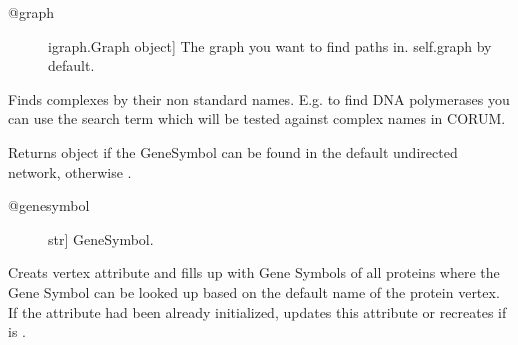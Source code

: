 \documentclass[letterpaper,10pt,english]{sphinxmanual}
\begin{document}
\begin{fulllineitems}
\begin{fulllineitems}
\begin{description}
\item[{@graph}] \leavevmode{[}igraph.Graph object{]}
The graph you want to find paths in. self.graph by default.

\end{description}

\end{fulllineitems}


\begin{fulllineitems}
\label{\detokenize{main:pypath.main.PyPath.find_complex}}
Finds complexes by their non standard names.
E.g. to find DNA polymerases you can use the search
term  which will be tested against complex names
in CORUM.

\end{fulllineitems}


\begin{fulllineitems}
\label{\detokenize{main:pypath.main.PyPath.genesymbol}}
Returns  object if the GeneSymbol
can be found in the default undirected network,
otherwise .
\begin{description}
\item[{@genesymbol}] \leavevmode{[}str{]}
GeneSymbol.

\end{description}

\end{fulllineitems}


\begin{fulllineitems}
\label{\detokenize{main:pypath.main.PyPath.genesymbol_labels}}
Creats vertex attribute  and fills up with Gene Symbols
of all proteins where the Gene Symbol can be looked up based on
the default name of the protein vertex.
If the attribute  had been already initialized,
updates this attribute or recreates if 
is .


\end{fulllineitems}
\end{fulllineitems}
\end{document}
